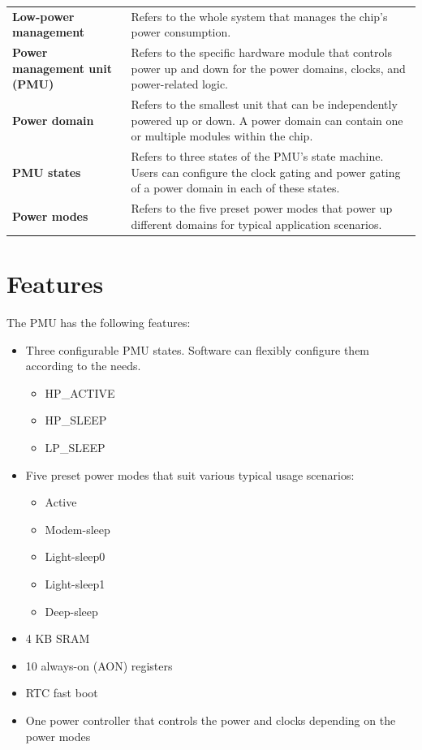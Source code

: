 \documentclass[main\_\_EN.tex]{subfiles}
\begin{document}
\begin{longtable}[c]{ R{6cm} p{10cm} }
\textbf{Low-power management} & Refers to the whole system that manages the chip's power consumption. \\
\textbf{Power management unit (PMU)} & Refers to the specific hardware module that controls power up and down for the power domains, clocks, and power-related logic. \\
\textbf{Power domain} & Refers to the smallest unit that can be independently powered up or down. A power domain can contain one or multiple modules within the chip. \\
\textbf{PMU states} & Refers to three states of the PMU's state machine. Users can configure the clock gating and power gating of a power domain in each of these states.\\
\textbf{Power modes} & Refers to the five preset power modes that power up different domains for typical application scenarios.\\
\end{longtable}

\section{Features}

The PMU has the following features:

\begin{itemize}
    \item Three configurable PMU states. Software can flexibly configure them according to the needs.
        \begin{itemize}
        \item HP\_ACTIVE
        \item HP\_SLEEP
        \item LP\_SLEEP
        \end{itemize}
    \item Five preset power modes that suit various typical usage scenarios:
    \begin{itemize}
        \item Active
        \item Modem-sleep
        \item Light-sleep0
        \item Light-sleep1
        \item Deep-sleep
    \end{itemize}
    \item 4 KB SRAM
    \item 10 always-on (AON) registers
    \item RTC fast boot
    \item One power controller that controls the power and clocks depending on the power modes
\end{itemize}
\end{document}
